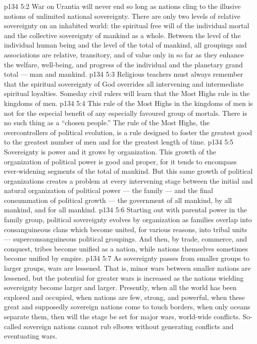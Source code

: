 \vs p134 5:2 \pc War on Urantia will never end so long as nations cling to the illusive notions of unlimited national sovereignty. There are only two levels of relative sovereignty on an inhabited world: the spiritual free will of the individual mortal and the collective sovereignty of mankind as a whole. Between the level of the individual human being and the level of the total of mankind, all groupings and associations are relative, transitory, and of value only in so far as they enhance the welfare, well\hyp{}being, and progress of the individual and the planetary grand total --- man and mankind.
\vs p134 5:3 Religious teachers must always remember that the spiritual sovereignty of God overrides all intervening and intermediate spiritual loyalties. Someday civil rulers will learn that the Most Highs rule in the kingdoms of men.
\vs p134 5:4 This rule of the Most Highs in the kingdoms of men is not for the especial benefit of any especially favoured group of mortals. There is no such thing as a “chosen people.” The rule of the Most Highs, the overcontrollers of political evolution, is a rule designed to foster the greatest good to the greatest number of  men and for the greatest length of time.
\vs p134 5:5 Sovereignty is power and it grows by organization. This growth of the organization of political power is good and proper, for it tends to encompass ever\hyp{}widening segments of the total of mankind. But this same growth of political organizations creates a problem at every intervening stage between the initial and natural organization of political power --- the family --- and the final consummation of political growth --- the government of all mankind, by all mankind, and for all mankind.
\vs p134 5:6 Starting out with parental power in the family group, political sovereignty evolves by organization as families overlap into consanguineous clans which become united, for various reasons, into tribal units --- superconsanguineous political groupings. And then, by trade, commerce, and conquest, tribes become unified as a nation, while nations themselves sometimes become unified by empire.
\vs p134 5:7 As sovereignty passes from smaller groups to larger groups, wars are lessened. That is, minor wars between smaller nations are lessened, but the potential for greater wars is increased as the nations wielding sovereignty become larger and larger. Presently, when all the world has been explored and occupied, when nations are few, strong, and powerful, when these great and supposedly sovereign nations come to touch borders, when only oceans separate them, then will the stage be set for major wars, world\hyp{}wide conflicts. So\hyp{}called sovereign nations cannot rub elbows without generating conflicts and eventuating wars.
